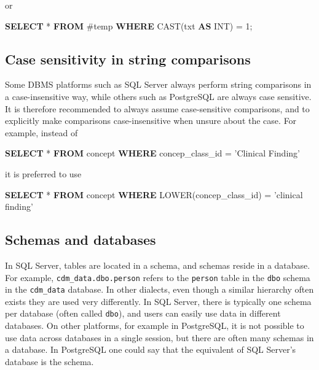 \documentclass[]{article}
\newenvironment{Shaded}{\begin{snugshade}}{\end{snugshade}}
\newcommand{\DataTypeTok}[1]{\textcolor[rgb]{0.13,0.29,0.53}{#1}}
\newcommand{\DecValTok}[1]{\textcolor[rgb]{0.00,0.00,0.81}{#1}}
\newcommand{\FunctionTok}[1]{\textcolor[rgb]{0.00,0.00,0.00}{#1}}
\newcommand{\KeywordTok}[1]{\textcolor[rgb]{0.13,0.29,0.53}{\textbf{#1}}}
\newcommand{\NormalTok}[1]{#1}
\newcommand{\StringTok}[1]{\textcolor[rgb]{0.31,0.60,0.02}{#1}}
\begin{document}
or

\begin{Shaded}
\begin{Highlighting}[]
\KeywordTok{SELECT}\NormalTok{ * }\KeywordTok{FROM}\NormalTok{ #temp }\KeywordTok{WHERE} \FunctionTok{CAST}\NormalTok{(txt }\KeywordTok{AS} \DataTypeTok{INT}\NormalTok{) = }\DecValTok{1}\NormalTok{;}
\end{Highlighting}
\end{Shaded}

\hypertarget{case-sensitivity-in-string-comparisons}{%
\subsection{Case sensitivity in string
comparisons}\label{case-sensitivity-in-string-comparisons}}

Some DBMS platforms such as SQL Server always perform string comparisons
in a case-insensitive way, while others such as PostgreSQL are always
case sensitive. It is therefore recommended to always assume
case-sensitive comparisons, and to explicitly make comparisons
case-insensitive when unsure about the case. For example, instead of

\begin{Shaded}
\begin{Highlighting}[]
\KeywordTok{SELECT}\NormalTok{ * }\KeywordTok{FROM}\NormalTok{ concept }\KeywordTok{WHERE}\NormalTok{ concep_class_id = }\StringTok{'Clinical Finding'}
\end{Highlighting}
\end{Shaded}

it is preferred to use

\begin{Shaded}
\begin{Highlighting}[]
\KeywordTok{SELECT}\NormalTok{ * }\KeywordTok{FROM}\NormalTok{ concept }\KeywordTok{WHERE} \FunctionTok{LOWER}\NormalTok{(concep_class_id) = }\StringTok{'clinical finding'}
\end{Highlighting}
\end{Shaded}

\hypertarget{schemas-and-databases}{%
\subsection{Schemas and databases}\label{schemas-and-databases}}

In SQL Server, tables are located in a schema, and schemas reside in a
database. For example, \texttt{cdm\_data.dbo.person} refers to the
\texttt{person} table in the \texttt{dbo} schema in the
\texttt{cdm\_data} database. In other dialects, even though a similar
hierarchy often exists they are used very differently. In SQL Server,
there is typically one schema per database (often called \texttt{dbo}),
and users can easily use data in different databases. On other
platforms, for example in PostgreSQL, it is not possible to use data
across databases in a single session, but there are often many schemas
in a database. In PostgreSQL one could say that the equivalent of SQL
Server's database is the schema.
\end{document}
